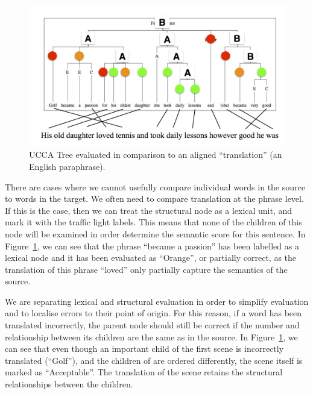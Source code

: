 \documentclass[11pt]{article}
\begin{document}
\begin{figure}[t]
    \includegraphics[width=1\textwidth]{ucca-tree-mteval}
    \caption{UCCA Tree evaluated in comparison to an aligned ``translation'' (an
	English paraphrase).}
    \label{ucca-tree-mteval}
\end{figure}


There are cases where we cannot usefully compare individual words in the source to words in the target.
We often need to compare translation at the phrase level. If this is the case, then we can 
 treat the structural node as a lexical unit, and mark it with the traffic light labels. This 
means that none of the children of this node will be examined in order determine the semantic score
for this sentence. 
In Figure~\ref{ucca-tree-mteval}, we can see that the phrase ``became a passion'' has been labelled as a lexical
node and it has been evaluated as ``Orange'', or partially correct, as the translation of this phrase ``loved'' 
only partially capture the semantics of the source.

We are separating lexical and structural evaluation in order to simplify evaluation and to localise errors
to their point of origin. For this reason, if a word has been translated incorrectly,
the parent node should still be correct if the number and relationship between its children are the same
as in the source. 
In Figure~\ref{ucca-tree-mteval}, we can see that even though an important child of the first scene is 
incorrectly translated (``Golf''), and the children of are ordered differently, 
the scene itself is marked as ``Acceptable''. The translation of the scene retains the structural 
relationships between the children.
\\

\newpage
\end{document}
